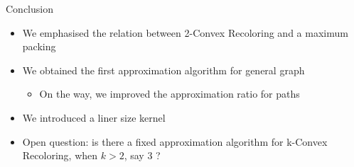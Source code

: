 \begin{frame}{Conclusion}
\begin{itemize}
	

\item
We emphasised the relation between 2-Convex Recoloring and a maximum packing 

\pause\item
We obtained the first approximation algorithm for general graph
\begin{itemize}
\pause\item
On the way, we improved the approximation ratio for paths 
\end{itemize}

\pause\item
We introduced a liner size kernel

\pause\item
Open question: is there a fixed approximation algorithm for k-Convex Recoloring, 
when $k > 2$, say 3 ?
		
	
\end{itemize}
\end{frame}